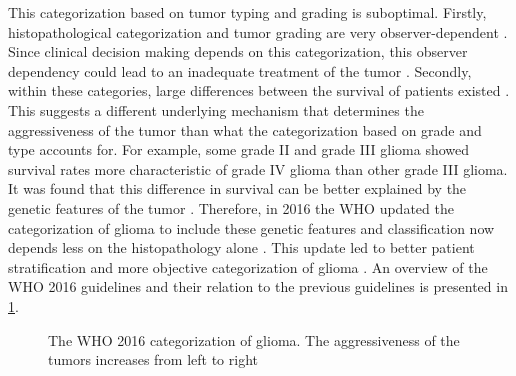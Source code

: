 This categorization based on \gls{tumor} typing and grading is suboptimal.
Firstly, histopathological categorization and \gls{tumor} grading are very observer-dependent \autocite{mittler1996gradingreliability, vandenbent2010interobserver}.
Since clinical decision making depends on this categorization, this observer dependency could lead to an inadequate treatment of the \gls{tumor} \autocite{vandenbent2010interobserver}.
Secondly, within these categories, large differences between the survival of patients existed  \autocite{dubbink2015molecular}.
This suggests a different underlying mechanism that determines the aggressiveness of the \gls{tumor} than what the categorization based on grade and type accounts for.
For example, some grade II and grade III \gls{glioma} showed survival rates more characteristic of grade IV \gls{glioma} than other grade III \gls{glioma}.
It was found that this difference in survival can be better explained by the genetic features of the \gls{tumor} \autocite{dubbink2015molecular,eckel2015gliomagroups}.
Therefore, in 2016 the \gls{WHO} updated the categorization of \gls{glioma} to include these genetic features and classification now depends less on the histopathology alone \autocite{louis20162016}.
This update led to better patient stratification and more objective categorization of \gls{glioma} \autocite{molinaro2019geneticepidemiology}.
An overview of the \gls{WHO} 2016 guidelines and their relation to the previous guidelines is presented in \cref{fig:intro_glioma_categorization}.

\begin{figure}[hbt]
    \centering
    \caption{The \acrfull{WHO} 2016 categorization of glioma. The aggressiveness of the \glspl{tumor} increases from left to right}\label{fig:intro_glioma_categorization}
\end{figure}

